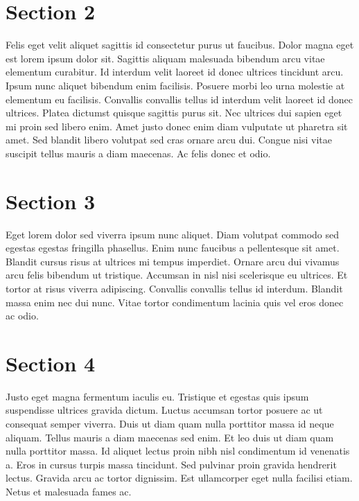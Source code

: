 \documentclass[
  BCOR=10mm, %
  DIV=12, %
  twoside, %
  headsepline, %
  listof=totoc, %
  bibliography=totoc, %
  index=totoc, %
  abstract=true, %
  numbers=noenddot, %
]{cs-thesis}
\begin{document}
    \section{Section 2}\label{section-2}

    Felis eget velit aliquet sagittis id consectetur purus ut faucibus.
    Dolor magna eget est lorem ipsum dolor sit. Sagittis aliquam
    malesuada bibendum arcu vitae elementum curabitur. Id interdum velit
    laoreet id donec ultrices tincidunt arcu. Ipsum nunc aliquet
    bibendum enim facilisis. Posuere morbi leo urna molestie at
    elementum eu facilisis. Convallis convallis tellus id interdum velit
    laoreet id donec ultrices. Platea dictumst quisque sagittis purus
    sit. Nec ultrices dui sapien eget mi proin sed libero enim. Amet
    justo donec enim diam vulputate ut pharetra sit amet. Sed blandit
    libero volutpat sed cras ornare arcu dui. Congue nisi vitae suscipit
    tellus mauris a diam maecenas. Ac felis donec et odio.

    \section{Section 3}\label{section-3-1}

    Eget lorem dolor sed viverra ipsum nunc aliquet. Diam volutpat
    commodo sed egestas egestas fringilla phasellus. Enim nunc faucibus
    a pellentesque sit amet. Blandit cursus risus at ultrices mi tempus
    imperdiet. Ornare arcu dui vivamus arcu felis bibendum ut tristique.
    Accumsan in nisl nisi scelerisque eu ultrices. Et tortor at risus
    viverra adipiscing. Convallis convallis tellus id interdum. Blandit
    massa enim nec dui nunc. Vitae tortor condimentum lacinia quis vel
    eros donec ac odio.

    \section{Section 4}\label{section-4-1}

    Justo eget magna fermentum iaculis eu. Tristique et egestas quis
    ipsum suspendisse ultrices gravida dictum. Luctus accumsan tortor
    posuere ac ut consequat semper viverra. Duis ut diam quam nulla
    porttitor massa id neque aliquam. Tellus mauris a diam maecenas sed
    enim. Et leo duis ut diam quam nulla porttitor massa. Id aliquet
    lectus proin nibh nisl condimentum id venenatis a. Eros in cursus
    turpis massa tincidunt. Sed pulvinar proin gravida hendrerit lectus.
    Gravida arcu ac tortor dignissim. Est ullamcorper eget nulla
    facilisi etiam. Netus et malesuada fames ac.
\end{document}
